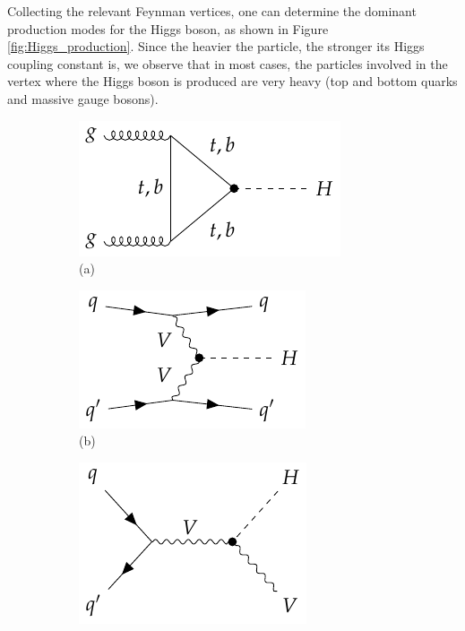Collecting the relevant Feynman vertices, one can determine the dominant production modes for the Higgs boson, as shown in Figure \ref{fig:Higgs_production}. Since the heavier the particle, the stronger its Higgs coupling constant is, we observe that in most cases, the particles involved in the vertex where the Higgs boson is produced are very heavy (top and bottom quarks and massive gauge bosons).

\begin{figure}[!ht]
    \captionsetup[subfigure]{labelformat=empty}
    \vspace*{-0.2cm}
    \centering
    \setlength{\mylength}{\textwidth}
    \begin{subfigure}[t]{0.33\mylength}
            \centering
            \includegraphics[height=0.16\mylength]{resources/H_production_diagrams/v1.pdf}
            \setlength{\unitlength}{0.25\mylength}
            \caption{\footnotesize (a)}
    \end{subfigure}%
    \begin{subfigure}[t]{0.33\mylength}
            \centering
            \includegraphics[height=0.16\mylength]{resources/H_production_diagrams/v2.pdf}
            \setlength{\unitlength}{0.25\mylength}
            \caption{\footnotesize (b)}
    \end{subfigure}%
    \begin{subfigure}[t]{0.33\mylength}
            \centering
            \includegraphics[height=0.185\mylength]{resources/H_production_diagrams/v3.pdf}

\end{subfigure}
\end{figure}
